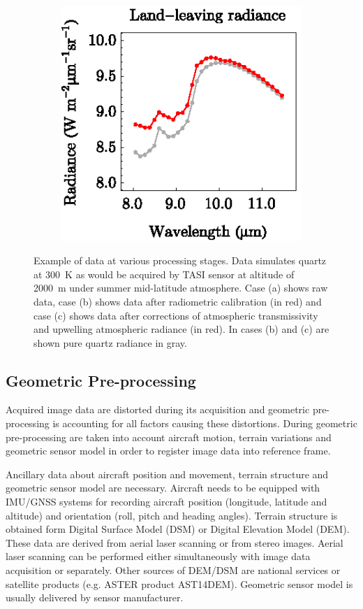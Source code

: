\begin{figure}[htb]
	\hspace{1em}
	\begin{subfigure}[t]{.3\linewidth}
		\centering
		\includegraphics[scale=1]{pics/Chapter_02/calibration-3-Lll.eps}
		\vspace{-0.4cm}
		\caption{}
	\end{subfigure}
	\vspace{1.5 em}
	\caption{Example of data at various processing stages. Data simulates quartz at \SI{300}{\kelvin} as would be acquired by TASI sensor at altitude of \SI{2000}{\meter} under summer mid-latitude atmosphere. Case (a) shows raw data, case (b) shows data after radiometric calibration (in red) and case (c) shows data after corrections of atmospheric transmissivity and upwelling atmospheric radiance (in red). In cases (b) and (c) are shown pure quartz radiance in gray.}
	\label{fig:RadAtmCorOfQuartz}
\end{figure}

\subsection{Geometric Pre-processing}

Acquired image data are distorted during its acquisition and geometric pre-processing is accounting for all factors causing these distortions. During geometric pre-processing are taken into account aircraft motion, terrain variations and geometric sensor model in order to register image data into reference frame.

Ancillary data about aircraft position and movement, terrain structure and geometric sensor model are necessary. Aircraft needs to be equipped with IMU/GNSS systems for recording aircraft position (longitude, latitude and altitude) and orientation (roll, pitch and heading angles). Terrain structure is obtained form Digital Surface Model (DSM) or Digital Elevation Model (DEM). These data are derived from aerial laser scanning or from stereo images. Aerial laser scanning can be performed either simultaneously with image data acquisition or separately. Other sources of DEM/DSM are national services or satellite products (e.g. ASTER product AST14DEM). Geometric sensor model is usually delivered by sensor manufacturer.

